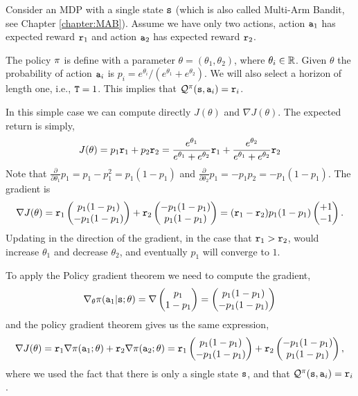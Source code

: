 \begin{example}\label{example:mab_pg}
Consider an MDP with a single state ${\tt s}$ (which is also called
Multi-Arm Bandit, see
Chapter \ref{chapter:MAB}).
Assume we have only two actions, action ${\tt a}_1$ has expected
reward ${\tt r}_1$ and action ${\tt a}_2$ has expected reward
${\tt r}_2$.

The policy $\pi$ is define with a parameter
$\theta=(\theta_1,\theta_2)$, where $\theta_i\in \mathbb{R}$. Given
$\theta$ the probability of action ${\tt a}_i$ is
$p_i=e^{\theta_i}/(e^{\theta_1}+e^{\theta_2})$. We will also select
a horizon of length one, i.e., ${\tt T}=1$. This implies that
$\mathcal{Q}^\pi({\tt s},{\tt a}_i)={\tt r}_i$.

In this simple case we can compute directly $J(\theta)$ and $\nabla
J(\theta)$. The expected return is simply,
\[
J(\theta)=p_1 {\tt r}_1 + p_2 {\tt r}_2 =
\frac{e^{\theta_1}}{e^{\theta_1}+e^{\theta_2}} {\tt r}_1 +
\frac{e^{\theta_2}}{e^{\theta_1}+e^{\theta_2}} {\tt r}_2
\]
Note that $\frac{\partial}{\partial \theta_1} p_1=
p_1-p_1^2=p_1(1-p_1) $ and $\frac{\partial }{\partial \theta_2} p_1=
- p_1 p_2= -p_1(1-p_1)$. The gradient is
\[
\nabla J(\theta)= {\tt r}_1 \begin{pmatrix} p_1(1-p_1)\\
-p_1(1-p_1)\end{pmatrix} + {\tt r}_2 \begin{pmatrix} -p_1(1-p_1)\\
p_1(1-p_1)\end{pmatrix} = ({\tt r}_1-{\tt r}_2) p_1(1-p_1) \begin{pmatrix}+1\\
-1\end{pmatrix}.
\]
Updating in the direction of the gradient, in the case that
${\tt r}_1>{\tt r}_2$, would increase $\theta_1$ and decrease
$\theta_2$, and eventually $p_1$ will converge to $1$.

To apply the Policy gradient theorem we need to compute the
gradient,
\[
\nabla_\theta \pi({\tt a}_1|{\tt s};\theta) = \nabla \begin{pmatrix} p_1\\
1-p_1\end{pmatrix}=  \begin{pmatrix} p_1(1-p_1)\\
-p_1(1-p_1)\end{pmatrix}
\]
and the policy gradient theorem gives us the same expression,
\[
\nabla J(\theta) = {\tt r}_1 \nabla
\pi({\tt a}_1;\theta)+{\tt r}_2 \nabla
\pi({\tt a}_2;\theta)={\tt r}_1 \begin{pmatrix} p_1(1-p_1)\\
-p_1(1-p_1)\end{pmatrix} + {\tt r}_2 \begin{pmatrix} -p_1(1-p_1)\\
p_1(1-p_1)\end{pmatrix},
\]
where we used the fact that there is only a single state ${\tt s}$,
and that $\mathcal{Q}^\pi({\tt s},{\tt a}_i)={\tt r}_i$.
\end{example}

